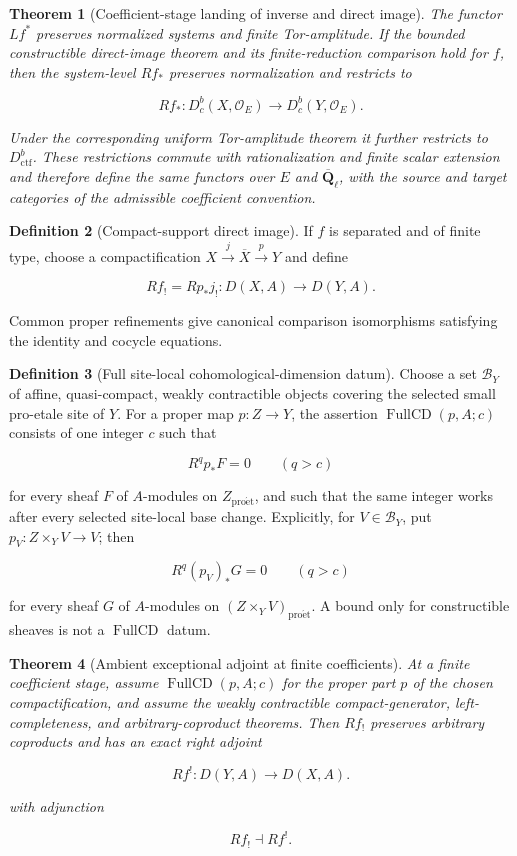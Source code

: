 \documentclass[10pt]{article}
\newtheorem{theorem}{Theorem}[section]
\theoremstyle{definition}
\newtheorem{definition}[theorem]{Definition}
\newcommand{\Qlb}{\overline{\mathbf Q}_\ell}
\newcommand{\OO}{\mathcal O}
\newcommand{\Dbc}{D^b_c}
\newcommand{\Dctf}{D^b_{\mathrm{ctf}}}
\begin{document}
\begin{theorem}[Coefficient-stage landing of inverse and direct image]
The functor \(Lf^*\) preserves normalized systems and finite Tor-amplitude.
If the bounded constructible direct-image theorem and its finite-reduction
comparison hold for \(f\), then the system-level \(Rf_*\) preserves
normalization and restricts to

\[
 Rf_*:\Dbc(X,\OO_E)\longrightarrow\Dbc(Y,\OO_E).
\]

Under the corresponding uniform Tor-amplitude theorem it further restricts
to \(\Dctf\).  These restrictions commute with rationalization and finite
scalar extension and therefore define the same functors over \(E\) and
\(\Qlb\), with the source and target categories of the admissible coefficient
convention.
\end{theorem}

\begin{definition}[Compact-support direct image]
If \(f\) is separated and of finite type, choose a compactification
\(X\xrightarrow j\overline X\xrightarrow pY\) and define

\[
 Rf_!=Rp_*j_!:D(X,A)\longrightarrow D(Y,A).
\]

Common proper refinements give canonical comparison isomorphisms satisfying
the identity and cocycle equations.
\end{definition}

\begin{definition}[Full site-local cohomological-dimension datum]
Choose a set \(\mathcal B_Y\) of affine, quasi-compact, weakly contractible
objects covering the selected small pro-etale site of \(Y\).  For a proper
map \(p:Z\to Y\), the assertion
\(\operatorname{FullCD}(p,A;c)\) consists of one integer \(c\) such that

\[
 R^qp_*F=0\qquad(q>c)
\]

for every sheaf \(F\) of \(A\)-modules on \(Z_{\mathrm{pro\acute et}}\), and
such that the same integer works after every selected site-local base
change.  Explicitly, for \(V\in\mathcal B_Y\), put
\(p_V:Z\times_YV\to V\); then

\[
 R^q(p_V)_*G=0\qquad(q>c)
\]

for every sheaf \(G\) of \(A\)-modules on
\((Z\times_YV)_{\mathrm{pro\acute et}}\).  A bound only for constructible
sheaves is not a \(\operatorname{FullCD}\) datum.
\end{definition}

\begin{theorem}[Ambient exceptional adjoint at finite coefficients]
At a finite coefficient stage, assume
\(\operatorname{FullCD}(p,A;c)\) for the proper part \(p\) of the chosen
compactification, and assume the weakly contractible compact-generator,
left-completeness, and arbitrary-coproduct theorems.  Then \(Rf_!\) preserves
arbitrary coproducts and has an exact right adjoint

\[
 Rf^!:D(Y,A)\longrightarrow D(X,A).
\]

with adjunction

\[
 Rf_!\dashv Rf^!.
\]
\end{theorem}
\end{document}
